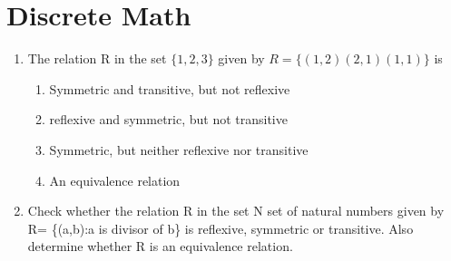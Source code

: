 \documentclass[journal,12pt,twocolumn]{IEEEtran}
\renewcommand\thesection{\arabic{section}}
\begin{document}
 \section{Discrete Math }
\begin{enumerate}[label=\thesection.\arabic*.,ref=\thesection.\theenumi]
\item  The relation R in the set $ \{1,2,3\}$  given by $R=\{(1,2)(2,1)(1,1)\}$ is

\begin{enumerate}
    \item Symmetric and transitive, but not reflexive  \\
    \item reflexive and symmetric, but not transitive  \\
    \item Symmetric, but neither reflexive nor transitive \\
    \item An equivalence relation 
\end{enumerate}
  \item Check whether the relation R in the set N set of natural numbers given by R= \{(a,b):a is divisor of b\} is reflexive, symmetric or transitive. Also determine whether R is an equivalence relation. 
\end{enumerate}
\end{document}
